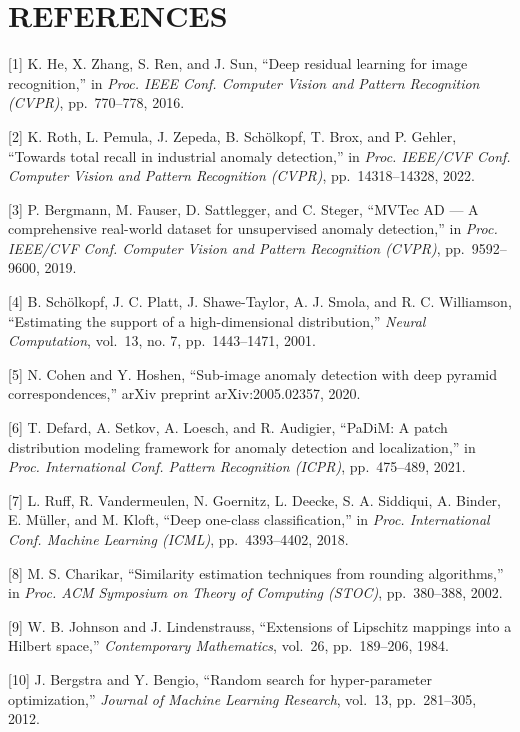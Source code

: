 \section{REFERENCES}\label{references}

{[}1{]} K. He, X. Zhang, S. Ren, and J. Sun, ``Deep residual learning for image recognition,'' in \emph{Proc. IEEE Conf. Computer Vision and Pattern Recognition (CVPR)}, pp.~770--778, 2016.

{[}2{]} K. Roth, L. Pemula, J. Zepeda, B. Schölkopf, T. Brox, and P. Gehler, ``Towards total recall in industrial anomaly detection,'' in \emph{Proc. IEEE/CVF Conf. Computer Vision and Pattern Recognition (CVPR)}, pp.~14318--14328, 2022.

{[}3{]} P. Bergmann, M. Fauser, D. Sattlegger, and C. Steger, ``MVTec AD --- A comprehensive real-world dataset for unsupervised anomaly detection,'' in \emph{Proc. IEEE/CVF Conf. Computer Vision and Pattern Recognition (CVPR)}, pp.~9592--9600, 2019.

{[}4{]} B. Schölkopf, J. C. Platt, J. Shawe-Taylor, A. J. Smola, and R. C. Williamson, ``Estimating the support of a high-dimensional distribution,'' \emph{Neural Computation}, vol.~13, no. 7, pp.~1443--1471, 2001.

{[}5{]} N. Cohen and Y. Hoshen, ``Sub-image anomaly detection with deep pyramid correspondences,'' arXiv preprint arXiv:2005.02357, 2020.

{[}6{]} T. Defard, A. Setkov, A. Loesch, and R. Audigier, ``PaDiM: A patch distribution modeling framework for anomaly detection and localization,'' in \emph{Proc. International Conf. Pattern Recognition (ICPR)}, pp.~475--489, 2021.

{[}7{]} L. Ruff, R. Vandermeulen, N. Goernitz, L. Deecke, S. A. Siddiqui, A. Binder, E. Müller, and M. Kloft, ``Deep one-class classification,'' in \emph{Proc. International Conf. Machine Learning (ICML)}, pp.~4393--4402, 2018.

{[}8{]} M. S. Charikar, ``Similarity estimation techniques from rounding algorithms,'' in \emph{Proc. ACM Symposium on Theory of Computing (STOC)}, pp.~380--388, 2002.

{[}9{]} W. B. Johnson and J. Lindenstrauss, ``Extensions of Lipschitz mappings into a Hilbert space,'' \emph{Contemporary Mathematics}, vol.~26, pp.~189--206, 1984.

{[}10{]} J. Bergstra and Y. Bengio, ``Random search for hyper-parameter optimization,'' \emph{Journal of Machine Learning Research}, vol.~13, pp.~281--305, 2012.

